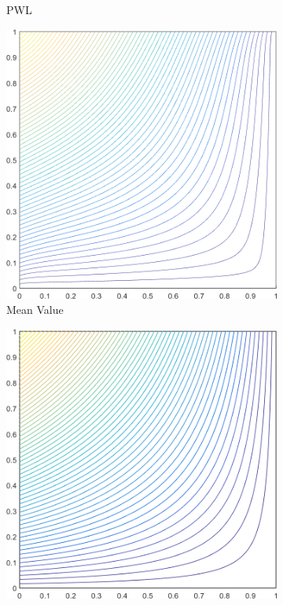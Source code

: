 \begin{figure}
{\begin{subfigure}[b]{0.39\textwidth}
		\caption{PWL}
	\end{subfigure}
}
	\vspace{3mm}
{
	\begin{subfigure}[b]{0.39\textwidth}
		\centering
		\includegraphics[width=\textwidth]{figures/sec_BF/square_MV1_contour_b4.png}
		\caption{Mean Value}
	\end{subfigure}
	\hspace{1.5cm}
	\begin{subfigure}[b]{0.39\textwidth}
		\centering
		\includegraphics[width=\textwidth]{figures/sec_BF/square_MAXENT1_contour_b4.png}

\end{subfigure}}
\end{figure}
